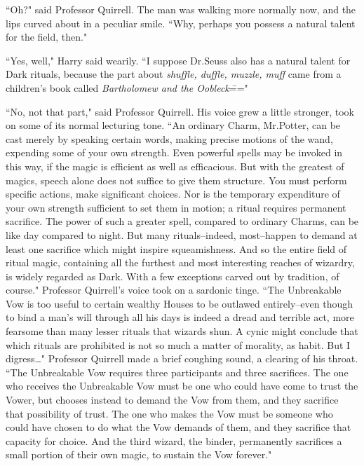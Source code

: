 ``Oh?" said Professor Quirrell. The man was walking more normally now, and the lips curved about in a peculiar smile. ``Why, perhaps you possess a natural talent for the field, then."

``Yes, well," Harry said wearily. ``I suppose Dr.\?Seuss also has a natural talent for Dark rituals, because the part about \emph{shuffle, duffle, muzzle, muff} came from a children's book called \emph{Bartholomew and the Oobleck}\==="

``No, not that part," said Professor Quirrell. His voice grew a little stronger, took on some of its normal lecturing tone. ``An ordinary Charm, Mr.\?Potter, can be cast merely by speaking certain words, making precise motions of the wand, expending some of your own strength. Even powerful spells may be invoked in this way, if the magic is efficient as well as efficacious. But with the greatest of magics, speech alone does not suffice to give them structure. You must perform specific actions, make significant choices. Nor is the temporary expenditure of your own strength sufficient to set them in motion; a ritual requires permanent sacrifice. The power of such a greater spell, compared to ordinary Charms, can be like day compared to night. But many rituals\---indeed, most\---happen to demand at least one sacrifice which might inspire squeamishness. And so the entire field of ritual magic, containing all the furthest and most interesting reaches of wizardry, is widely regarded as Dark. With a few exceptions carved out by tradition, of course." Professor Quirrell's voice took on a sardonic tinge. ``The Unbreakable Vow is too useful to certain wealthy Houses to be outlawed entirely\---even though to bind a man's will through all his days is indeed a dread and terrible act, more fearsome than many lesser rituals that wizards shun. A cynic might conclude that which rituals are prohibited is not so much a matter of morality, as habit. But I digress{\ldots}" Professor Quirrell made a brief coughing sound, a clearing of his throat. ``The Unbreakable Vow requires three participants and three sacrifices. The one who receives the Unbreakable Vow must be one who could have come to trust the Vower, but chooses instead to demand the Vow from them, and they sacrifice that possibility of trust. The one who makes the Vow must be someone who could have chosen to do what the Vow demands of them, and they sacrifice that capacity for choice. And the third wizard, the binder, permanently sacrifices a small portion of their own magic, to sustain the Vow forever."

